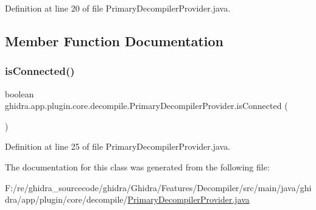 Definition at line 20 of file Primary\+Decompiler\+Provider.\+java.



\subsection{Member Function Documentation}
\mbox{\label{classghidra_1_1app_1_1plugin_1_1core_1_1decompile_1_1_primary_decompiler_provider_ad8cede17b8154402a7c101f3a80bc78f}} 
\subsubsection{\texorpdfstring{isConnected()}{isConnected()}}
{\footnotesize\ttfamily boolean ghidra.\+app.\+plugin.\+core.\+decompile.\+Primary\+Decompiler\+Provider.\+is\+Connected (\begin{DoxyParamCaption}{ }\end{DoxyParamCaption})\hspace{0.3cm}{\ttfamily [inline]}}



Definition at line 25 of file Primary\+Decompiler\+Provider.\+java.



The documentation for this class was generated from the following file\+:\begin{DoxyCompactItemize}
\item 
F\+:/re/ghidra\+\_\+sourcecode/ghidra/\+Ghidra/\+Features/\+Decompiler/src/main/java/ghidra/app/plugin/core/decompile/\mbox{\hyperlink{_primary_decompiler_provider_8java}{Primary\+Decompiler\+Provider.\+java}}\end{DoxyCompactItemize}
